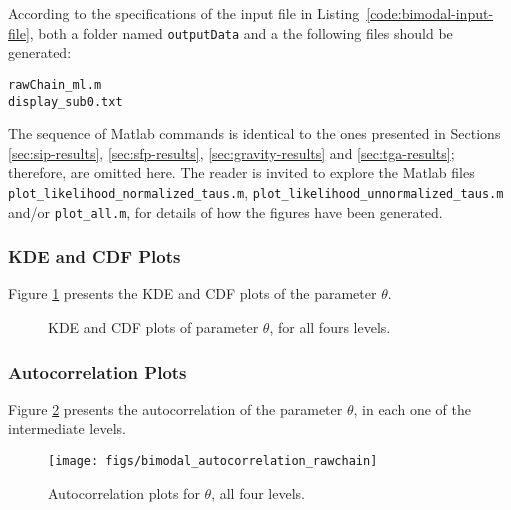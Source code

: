 According to the specifications of the input file in Listing~\ref{code:bimodal-input-file}, both a folder named \verb+outputData+ and a the following files should be generated:
\begin{verbatim}
rawChain_ml.m 
display_sub0.txt    
\end{verbatim}


The sequence of Matlab commands is identical to the ones presented in Sections
\ref{sec:sip-results}, \ref{sec:sfp-results}, \ref{sec:gravity-results} and \ref{sec:tga-results};
therefore, are omitted here. The reader is invited to explore the Matlab files
\texttt{plot\_likelihood\_normalized\_taus.m},
\texttt{plot\_likelihood\_unnormalized\_taus.m} and/or \texttt{plot\_all.m},  for details of how the figures have been generated.



\subsubsection{KDE and CDF Plots}

Figure \ref{fig:bimodal_kde} presents the KDE and CDF plots of the parameter $\theta$. 



\begin{figure}[hptb]
\centering
{}
\vspace{-8pt}
\caption{KDE and CDF plots of parameter $\theta$, for all fours levels.}
\label{fig:bimodal_kde}
\end{figure}

\subsubsection{Autocorrelation Plots}

Figure \ref{fig:bimodal_autocorr} presents the autocorrelation of the parameter $\theta$, in each one of the intermediate levels.

\begin{figure}[htpb]
\centering
\texttt{[image: figs/bimodal\_autocorrelation\_rawchain]}
\vspace{-10pt}
\caption{Autocorrelation plots for $\theta$, all four levels.}
\label{fig:bimodal_autocorr}
\end{figure}



